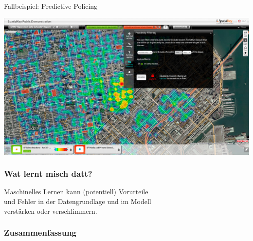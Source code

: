 \documentclass[aspectratio=43]{beamer}
\begin{document}
\begin{frame}
\frametitle{}
Fallbeispiel: \glqq Predictive Policing\grqq

\begin{center}
\includegraphics[scale=0.25]{images/predictive_policing.jpg} 
\end{center}
\end{frame}

\begin{frame}
\frametitle{Wat lernt misch datt?}
\begin{center}
\color{red}
\large
Maschinelles Lernen kann (potentiell) Vorurteile\\und Fehler
in der Datengrundlage und im Modell\\verstärken oder verschlimmern.
\end{center}
\end{frame}


\begin{frame}
\frametitle{Zusammenfassung}
\end{frame}
\end{document}
